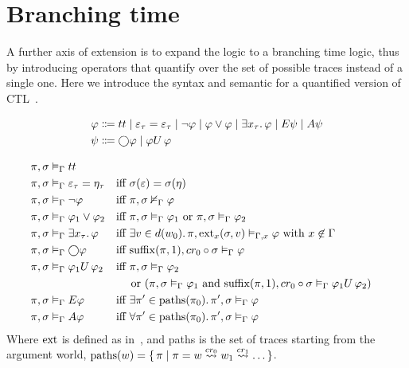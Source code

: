 \section{Branching time}
A further axis of extension is to expand the logic to a branching time logic, thus by introducing operators that
quantify over the set of possible traces instead of a single one. Here we introduce the syntax and semantic for a
quantified version of \ac{CTL}~\cite{hodkinson_decidable_2002}.

\begin{align*}
  \varphi &\Coloneqq tt \;|\; \varepsilon_\tau = \varepsilon_\tau
                    \;|\; \neg\varphi
                    \;|\; \varphi \lor \varphi
                    \;|\; \exists {x_\tau} \ldotp {\varphi}
                    \;|\; E{\psi}
                    \;|\; A{\psi} \\
  \psi &\Coloneqq \bigcirc{\varphi} \;|\; {\varphi}U\,{\varphi}
\end{align*}

\begin{align*}
  \pi, \sigma &\vDash_\Gamma tt \\
  \pi, \sigma &\vDash_\Gamma \varepsilon_\tau = \eta_\tau &&\text{iff } \sigma(\varepsilon) = \sigma(\eta) \\
  \pi, \sigma &\vDash_\Gamma \neg\varphi &&\text{iff } {\pi}, {\sigma} \nvDash_{\Gamma} {\varphi} \\
  \pi, \sigma &\vDash_\Gamma \varphi_1 \lor \varphi_2
      &&\text{iff } {\pi}, {\sigma} \vDash_{\Gamma} {\varphi_1} \text{ or } {\pi}, {\sigma} \vDash_{\Gamma} {\varphi_2} \\
  \pi, \sigma &\vDash_\Gamma \exists {x_\tau} \ldotp {\varphi}
      &&\text{iff } \exists {v \in d(w_0)} \ldotp {{\pi}, {\operatorname{ext}_x(\sigma, v)} \vDash_{\Gamma, x} {\varphi}}
        \text{ with } x \not\in \Gamma \\
  \pi, \sigma &\vDash_\Gamma \bigcirc{\varphi}
      &&\text{iff } {\operatorname{suffix}(\pi, 1)}, {cr_0 \circ \sigma} \vDash_{\Gamma} {\varphi} \\
  \pi, \sigma &\vDash_\Gamma {\varphi_1}U\,{\varphi_2}
      &&\text{iff } {\pi}, {\sigma} \vDash_{\Gamma} {\varphi_2} \\ &&&\quad\text{ or } ({\pi}, {\sigma} \vDash_{\Gamma} {\varphi_1}
        \text { and } {\operatorname{suffix}(\pi, 1)}, {cr_0 \circ \sigma} \vDash_{\Gamma} {{\varphi_1}U\,{\varphi_2}}) \\
  \pi, \sigma &\vDash_\Gamma E{\varphi}
      &&\text{iff } \exists {\pi' \in \operatorname{paths}(\pi_0)} \ldotp {{\pi'}, {\sigma} \vDash_{\Gamma} {\varphi}} \\
  \pi, \sigma &\vDash_\Gamma A{\varphi}
      &&\text{iff } \forall {\pi' \in \operatorname{paths}(\pi_0)} \ldotp {{\pi'}, {\sigma} \vDash_{\Gamma} {\varphi}} \\
\end{align*}
Where $\operatorname{ext}$ is defined as in~, and paths is the set of traces starting from the argument world,
$\operatorname{paths}(w) = \set{\pi | \pi = w \overset{cr_0}{\rightsquigarrow} w_1 \overset{cr_1}{\rightsquigarrow} \ldots}$.

